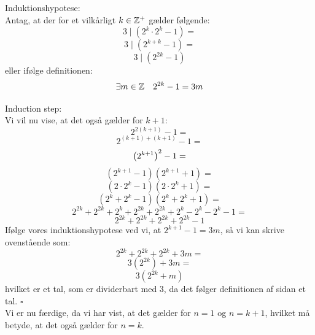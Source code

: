 \documentclass[a4paper,12pt]{article}
\begin{document}
Induktionshypotese:\\
Antag, at der for et vilkårligt $k \in \mathbb{Z}^+$ gælder følgende:\\
\[3 \mid (2^k \cdot 2^k - 1) = \]
\[3 \mid (2^{k+k} - 1) = \]
\[3 \mid (2^{2k} - 1)\]
eller ifølge definitionen:\\
\[\exists m\in \mathbb{Z} \quad 2^{2k} - 1 = 3m\]

Induction step:\\
Vi vil nu vise, at det også gælder for $k+1$:\\
\[2^{2(k+1)} - 1 = \]
\[2^{(k+1)+(k+1)} - 1 = \]
\[\left( 2^{k+1}\right)^2 - 1 = \]
\[(2^{k+1} - 1)(2^{k+1} + 1)=\]
\[(2 \cdot 2^{k} - 1)(2 \cdot 2^{k} + 1)=\]
\[( 2^{k} +  2^{k} - 1)( 2^{k} +  2^{k} + 1)=\]
\[2^{2k} + 2^{2k} + 2^k + 2^{2k} + 2^{2k} + 2^k - 2^k - 2^k - 1=\]
\[2^{2k} + 2^{2k} + 2^{2k} + 2^{2k} - 1\]
Ifølge vores induktionshypotese ved vi, at $2^{k+1} - 1 = 3m$, så vi kan skrive ovenstående som:
\[2^{2k} + 2^{2k} + 2^{2k} + 3m =\]
\[3(2^{2k}) + 3m = \]
\[3(2^{2k} + m)\]
hvilket er et tal, som er dividerbart med $3$, da det følger definitionen af sidan et tal. $\square\ $\\

Vi er nu færdige, da vi har vist, at det gælder for $n = 1$ og $n = k+1$, hvilket må betyde, at det også gælder for $n = k$.
\end{document}

